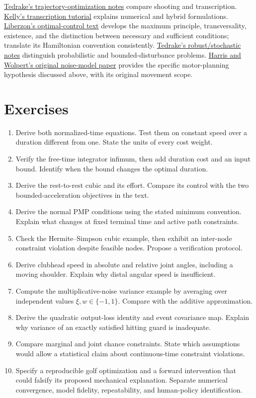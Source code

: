 \documentclass[12pt, openany]{book}
\theoremstyle{plain}
\begin{document}
\href{https://underactuated.mit.edu/trajopt.html}{Tedrake's trajectory-optimization
notes} compare shooting and transcription. \href{https://arxiv.org/abs/1707.00284}{Kelly's
transcription tutorial} explains numerical and hybrid formulations.
\href{https://liberzon.csl.illinois.edu/teaching/cvoc/node1.html}{Liberzon's
optimal-control text} develops the maximum principle, transversality,
existence, and the distinction between necessary and sufficient conditions;
translate its Hamiltonian convention consistently.
\href{https://underactuated.mit.edu/robust.html}{Tedrake's robust/stochastic
notes} distinguish probabilistic and bounded-disturbance problems.
\href{https://www.nature.com/articles/29528}{Harris and Wolpert's original
noise-model paper} provides the specific motor-planning hypothesis discussed
above, with its original movement scope.

\section{Exercises}

\begin{enumerate}[itemsep=3pt,parsep=0pt]
\item Derive both normalized-time equations. Test them on constant speed
over a duration different from one. State the units of every cost weight.
\item Verify the free-time integrator infimum, then add duration cost and
an input bound. Identify when the bound changes the optimal duration.
\item Derive the rest-to-rest cubic and its effort. Compare its control
with the two bounded-acceleration objectives in the text.
\item Derive the normal PMP conditions using the stated minimum convention.
Explain what changes at fixed terminal time and active path constraints.
\item Check the Hermite--Simpson cubic example, then exhibit an inter-node
constraint violation despite feasible nodes. Propose a verification protocol.
\item Derive clubhead speed in absolute and relative joint angles, including
a moving shoulder. Explain why distal angular speed is insufficient.
\item Compute the multiplicative-noise variance example by averaging over
independent values $\xi,w\in\{-1,1\}$. Compare with the additive approximation.
\item Derive the quadratic output-loss identity and event covariance map.
Explain why variance of an exactly satisfied hitting guard is inadequate.
\item Compare marginal and joint chance constraints. State which assumptions
would allow a statistical claim about continuous-time constraint violations.
\item Specify a reproducible golf optimization and a forward intervention
that could falsify its proposed mechanical explanation. Separate numerical
convergence, model fidelity, repeatability, and human-policy identification.
\end{enumerate}
\end{document}
